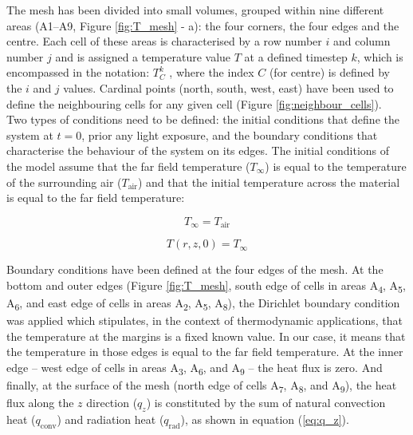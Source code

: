 
The mesh has been divided into small volumes, grouped within nine different areas (A1–A9, Figure \ref{fig:T_mesh} - a): the four corners, the four edges and the centre. Each cell of these areas is characterised by a row number $i$ and column number $j$ and is assigned a temperature value $T$ at a defined timestep $k$, which is encompassed in the notation: $T^k_C$ , where the index $C$ (for centre) is defined by the $i$ and $j$ values. Cardinal points (north, south, west, east) have been used to define the neighbouring cells for any given cell (Figure \ref{fig:neighbour_cells}). \\


Two types of conditions need to be defined: the initial conditions that define the system at $t=0$, prior any light exposure, and the boundary conditions that characterise the behaviour of the system on its edges. The initial conditions of the model assume that the far field temperature ($T_\infty$) is equal to the temperature of the surrounding air ($T_{\mathrm{air}}$) and that the initial temperature across the material is equal to the far field temperature:

\begin{equation}
T_\infty = T_{\mathrm{air}}
\end{equation}
 
\begin{equation}
T(r,z,0) = T_\infty
\end{equation}



Boundary conditions have been defined at the four edges of the mesh. At the bottom and outer edges (Figure \ref{fig:T_mesh}, south edge of cells in areas A\textsubscript{4}, A\textsubscript{5}, A\textsubscript{6}, and east edge of cells in areas A\textsubscript{2}, A\textsubscript{5}, A\textsubscript{8}), the Dirichlet boundary condition was applied which stipulates, in the context of thermodynamic applications, that the temperature at the margins is a fixed known value. In our case, it means that the temperature in those edges is equal to the far field temperature. At the inner edge – west edge of cells in areas A\textsubscript{3}, A\textsubscript{6}, and A\textsubscript{9} – the heat flux is zero. And finally, at the surface of the mesh (north edge of cells A\textsubscript{7}, A\textsubscript{8}, and A\textsubscript{9}), the heat flux along the $z$ direction ($q_z$) is constituted by the sum of natural convection heat ($q_{\mathrm{conv}}$) and radiation heat ($q_{\mathrm{rad}}$), as shown in equation (\ref{eq:q_z}). 

